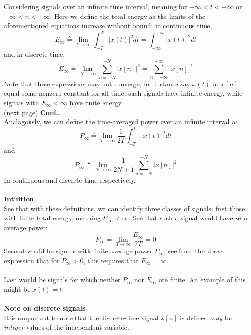 \documentclass{report}
\begin{document}
Considering signals over an infinite time interval, meaning for $-\infty<t<+\infty$ or $-\infty<n<+\infty$. 
Here we define the total energy as the limits of the aforementioned equations increase without bound; in continuous
time,
\begin{equation*}
E_\infty\triangleq\lim_{T\to\infty}\int^T_{-T}|x(t)|^2dt
=\int^{+\infty}_{-\infty}|x(t)|^2dt
\end{equation*}
and in discrete time,
\begin{equation*}
E_\infty\triangleq\lim_{N\to\infty}\sum^{+N}_{n=-N}|x[n]|^2=\sum^{+\infty}_{n=-\infty}|x[n]|^2
\end{equation*}
Note that these expressions may not converge; for instance say $x(t)$ or $x[n]$ equal some nonzero constant for 
all time: such signals have infinite energy, while signals with $E_\infty<\infty$ have finite energy.\\
(next page)\newpage
\noindent\textbf{Cont.}\\
Analagously, we can define the time-averaged power over an infinite interval as
\begin{equation*}
P_\infty\triangleq\lim_{T\to\infty}\frac{1}{2T}\int^T_{-T}|x(t)|^2dt
\end{equation*}
and
\begin{equation*}
P_\infty\triangleq\lim_{N\to\infty}\frac{1}{2N+1}\sum^{+N}_{n=-N}|x[n]|^2
\end{equation*}
In continuous and discrete time respectively. \\
\vspace{1mm}\\
\textbf{Intuition}\\
See that with these definitions, we can identify three classes of signals: first those with finite total energy,
meaning $E_\infty<\infty$. See that such a signal would have zero average power:
\begin{equation*}
P_\infty=\lim_{T\to\infty}\frac{E_\infty}{2T}=0
\end{equation*}
Second would be signals with finite average power $P_\infty$; see from the above expression that for $P_\infty>0$,
this requires that $E_\infty=\infty$.\\
\vspace{1mm}\\
Last would be signals for which neither $P_\infty$ nor $E_\infty$ are finite. An example of this might be $x(t)=t$.\\
\vspace{1mm}\\
\textbf{Note on discrete signals}\\
It is omportant to note that the discrete-time signal $x[n]$ is defined \textit{only} for \textit{integer} 
values of the independent variable.
\newpage
\end{document}

